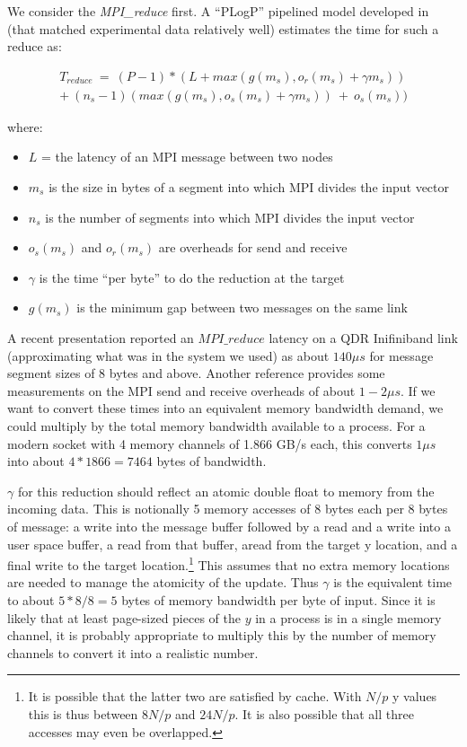We consider the \emph{MPI\_reduce} first. A ``PLogP'' pipelined model developed in \cite{techbib:Pjesivac-Grbovic:2007:PAM:1265235.1265248} (that matched experimental data relatively well) estimates the time for such a reduce as:
 
\begin{eqnarray}\label{eq:plogp}
T_{reduce}~=~(P-1)*(L+max(g(m_s),o_r(m_s)+\gamma m_s)) \\
+~(n_s-1)(max(g(m_s),o_s(m_s)+\gamma m_s))~+~o_s(m_s))
\end{eqnarray}

where:
\begin{itemize}[noitemsep]
\item $L$ =  the latency of an MPI message between two nodes
\item $m_s$ is the size in bytes of a segment into which MPI divides the input vector
\item $n_s$ is the number of segments into which MPI divides the input vector
\item $o_s(m_s)$ and $o_r(m_s)$ are overheads for send and receive
\item $\gamma$ is the time ``per byte'' to do the reduction at the target
\item $g(m_s)$ is the minimum gap between two messages on the same link
\end{itemize}

A recent presentation \cite{techbib:mvapich2} reported an $MPI\_reduce$ latency on a QDR Inifiniband link (approximating what was in the system we used) as about $140\mu s$ for message segment sizes of 8 bytes and above. Another reference \cite{techbib:Doerfler2006} provides some measurements on the MPI send and receive overheads of about $1-2{\mu}s$. If we want to convert these times into an equivalent memory bandwidth demand, we could multiply by the total memory bandwidth available to a process. For a modern socket with 4 memory channels of 1.866 GB/s each, this converts $1\mu s$ into about $4*1866=7464$ bytes of bandwidth.

$\gamma$ for this reduction should reflect an atomic double float to memory from the incoming data. This is notionally 5 memory accesses of 8 bytes each per 8 bytes of message: a write into the message buffer followed by a read and a write into a user space buffer, a read from that buffer, aread from the target y location, and a final write to the target location.\footnote{It is possible that the latter two are satisfied by cache. With $N/p$ y values this is thus between $8N/p$ and $24N/p$. It is also possible that all three accesses may even be overlapped.} This assumes that no extra memory locations are needed to manage the atomicity of the update. Thus $\gamma$ is the equivalent time to about $5*8/8 = 5$ bytes of memory bandwidth per byte of input. Since it is likely that at least page-sized pieces of the $y$  in a process is in a single memory channel, it is probably appropriate to multiply this by the number of memory channels to convert it into a realistic number.

